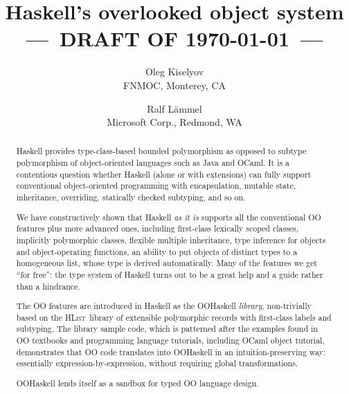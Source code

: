 \documentclass[nocopyrightspace,preprint]{sigplan-proc}
\newcommand{\HList}{\textsc{HList}}
\begin{document}
 
\title{Haskell's overlooked object system\\
{\small ---~DRAFT OF \today~---}\vspace{-77\in}}

\author{Oleg Kiselyov\\FNMOC, Monterey, CA
\and
Ralf L{\"a}mmel\\Microsoft Corp., Redmond, WA}




\maketitle

\begin{abstract}

Haskell provides type-class-based bounded polymorphism as opposed to
subtype polymorphism of object-oriented languages such as Java and
OCaml. It is a contentious question whether Haskell (alone or with
extensions) can fully support conventional object-oriented programming
with encapsulation, mutable state, inheritance, overriding, statically
checked subtyping, and so on.

We have constructively shown that Haskell \emph{as it is} supports all
the conventional OO features plus more advanced ones, including
first-class lexically scoped classes, implicitly polymorphic classes,
flexible multiple inheritance, type inference for objects and
object-operating functions, an ability to put objects of distinct
types to a homogeneous list, whose type is derived automatically. Many
of the features we get ``for free'': the type system of Haskell turns
out to be a great help and a guide rather than a hindrance.

The OO features are introduced in Haskell as the OOHaskell
\emph{library}, non-trivially based on the \HList\ library of
extensible polymorphic records with first-class labels and
subtyping. The library sample code, which is patterned after the
examples found in OO textbooks and programming language tutorials,
including OCaml object tutorial, demonstrates that OO code translates
into OOHaskell in an intuition-preserving way: essentially
expression-by-expression, without requiring global transformations.

OOHaskell lends itself as a sandbox for typed OO language design.

\end{abstract}
\end{document}

